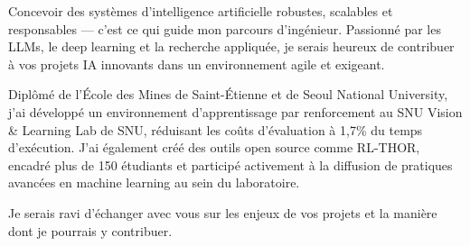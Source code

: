 
\newcommand{\Company}{DHM IT}
\recipient{\RecruitmentTeam{\Company}}{\Company\\Paris\\ France}
\date{}
\makelettertitle{}

Concevoir des systèmes d'intelligence artificielle robustes, scalables et responsables — c'est ce qui guide mon parcours d'ingénieur. Passionné par les LLMs, le deep learning et la recherche appliquée, je serais heureux de contribuer à vos projets IA innovants dans un environnement agile et exigeant.

Diplômé de l'École des Mines de Saint-Étienne et de Seoul National University, j'ai développé un environnement d'apprentissage par renforcement au SNU Vision \& Learning Lab de SNU, réduisant les coûts d'évaluation à 1,7\% du temps d'exécution. J'ai également créé des outils open source comme RL-THOR, encadré plus de 150 étudiants et participé activement à la diffusion de pratiques avancées en machine learning au sein du laboratoire.



Je serais ravi d'échanger avec vous sur les enjeux de vos projets et la manière dont je pourrais y contribuer.

\makeletterclosing

